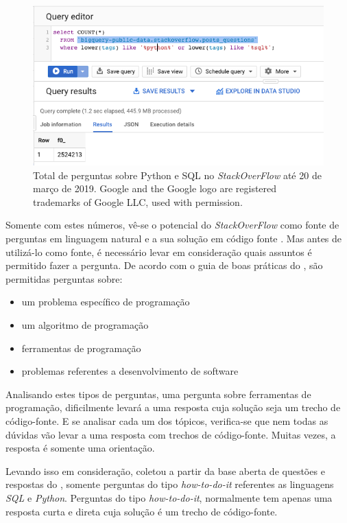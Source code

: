 \begin{figure}[h]
\includegraphics[width=12cm]{src/figuras/cap-problema/post-questions-python-sql-total.png}
\caption{Total de perguntas sobre Python e SQL no \textit{StackOverFlow} até 20 de março de 2019. Google and the Google logo are registered trademarks of Google LLC, used with permission.}
\label{fig:bigquery-total-questions-python-sql-stackoverflow}
\end{figure}

Somente com estes números, vê-se o potencial do \textit{StackOverFlow} como fonte de perguntas em linguagem natural e a sua solução em código fonte \cite{yao-2018}. Mas antes de utilizá-lo como fonte, é necessário levar em consideração quais assuntos é permitido fazer a pergunta. De acordo com o guia de boas práticas do \cite{stackoverflow-questions-topics-2019}, são permitidas perguntas sobre:

\begin{itemize}
    \item um problema específico de programação
    \item um algoritmo de programação
    \item ferramentas de programação
    \item problemas referentes a desenvolvimento de software
\end{itemize}

Analisando estes tipos de perguntas, uma pergunta sobre ferramentas de programação, dificilmente levará a uma resposta cuja solução seja um trecho de código-fonte. E se analisar cada um dos tópicos, verifica-se que nem todas as dúvidas vão levar a uma resposta com trechos de código-fonte. Muitas vezes, a resposta é somente uma orientação.

Levando isso em consideração, \citeauthor{yao-2018} coletou a partir da base aberta de questões e respostas do \cite{stackoverflow-questions-topics-2019}, somente perguntas do tipo \textit{how-to-do-it} referentes as linguagens \textit{SQL} e \textit{Python}. Perguntas do tipo \textit{how-to-do-it}, normalmente tem apenas uma resposta curta e direta cuja solução é um trecho de código-fonte. 

